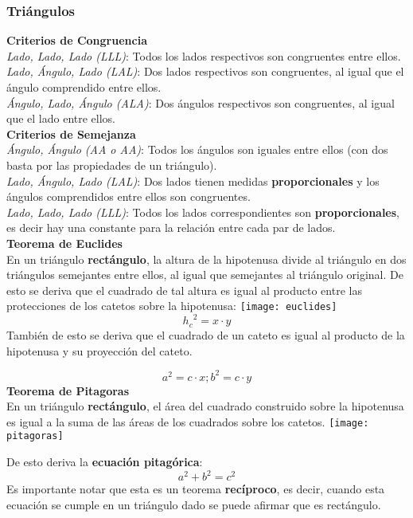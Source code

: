 \subsubsection{Triángulos}
\textbf{Criterios de Congruencia}\\
\textit{Lado, Lado, Lado (LLL)}: Todos los lados respectivos son congruentes entre ellos.\\
\textit{Lado, Ángulo, Lado (LAL)}: Dos lados respectivos son congruentes, al igual que el ángulo comprendido entre ellos.\\
\textit{Ángulo, Lado, Ángulo (ALA)}: Dos ángulos respectivos son congruentes, al igual que el lado entre ellos.\\

\textbf{Criterios de Semejanza}\\
\textit{Ángulo, Ángulo (AA o AA)}: Todos los ángulos son iguales entre ellos (con dos basta por las propiedades de un triángulo).\\
\textit{Lado, Ángulo, Lado (LAL)}: Dos lados tienen medidas \textbf{proporcionales} y los ángulos comprendidos entre ellos son congruentes.\\
\textit{Lado, Lado, Lado (LLL)}: Todos los lados correspondientes son \textbf{proporcionales}, es decir hay una constante para la relación entre cada par de lados.\\
\vfill\null\columnbreak
\textbf{Teorema de Euclides}\\
En un triángulo \textbf{rectángulo}, la altura de la hipotenusa divide al triángulo en dos triángulos semejantes entre ellos, al igual que semejantes al triángulo original. De esto se deriva que el cuadrado de tal altura es igual al producto entre las protecciones de los catetos sobre la hipotenusa:
\texttt{[image: euclides]}
\begin{equation*}
{h_c}^2 = x \cdot y
\end{equation*}
También de esto se deriva que el cuadrado de un cateto es igual al producto de la hipotenusa y su proyección del cateto.

\begin{equation*}
    a^2 = c \cdot x; b^2 = c \cdot y
\end{equation*}
\textbf{Teorema de Pitagoras}\\
En un triángulo \textbf{rectángulo}, el área del cuadrado construido sobre la hipotenusa es igual a la suma de las áreas de los cuadrados sobre los catetos.
\texttt{[image: pitagoras]}

De esto deriva la \textbf{ecuación pitagórica}:
\begin{equation*}
    a^2 + b^2 = c^2
\end{equation*}
Es importante notar que esta es un teorema \textbf{recíproco}, es decir, cuando esta ecuación se cumple en un triángulo dado se puede afirmar que es rectángulo.\\
\vfill\null\columnbreak
